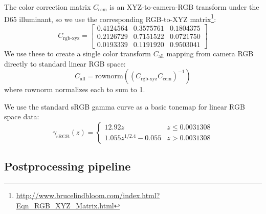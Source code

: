 The color correction matrix $C_\mathrm{ccm}$ is an XYZ-to-camera-RGB transform under the D65 illuminant, so we use the corresponding RGB-to-XYZ matrix\footnote{\url{http://www.brucelindbloom.com/index.html?Eqn_RGB_XYZ_Matrix.html}}:
\begin{equation}
    \!\!\!C_{\textrm{rgb-xyz}} = \left[ \begin{array}{ccc}
0.4124564  & 0.3575761  & 0.1804375\\
0.2126729  & 0.7151522  & 0.0721750\\
0.0193339  & 0.1191920  & 0.9503041 
    \end{array} \right]
\end{equation}
We use these to create a single color transform $C_\mathrm{all}$ mapping from camera RGB directly to standard linear RGB space:
\begin{equation}
    C_\mathrm{all} = \mathrm{rownorm}((C_{\textrm{rgb-xyz}}C_\mathrm{ccm})^{-1})
\end{equation}
where $\mathrm{rownorm}$ normalizes each to sum to 1.

We use the standard sRGB gamma curve as a basic tonemap for linear RGB space data:
\begin{equation}
    \gamma_\mathrm{sRGB}(z) = \begin{cases} 
      12.92z & z \leq 0.0031308 \\
      1.055z^{1/2.4}-0.055 & z > 0.0031308
   \end{cases}
\end{equation}

\subsection{Postprocessing pipeline}
\label{sec:post}

